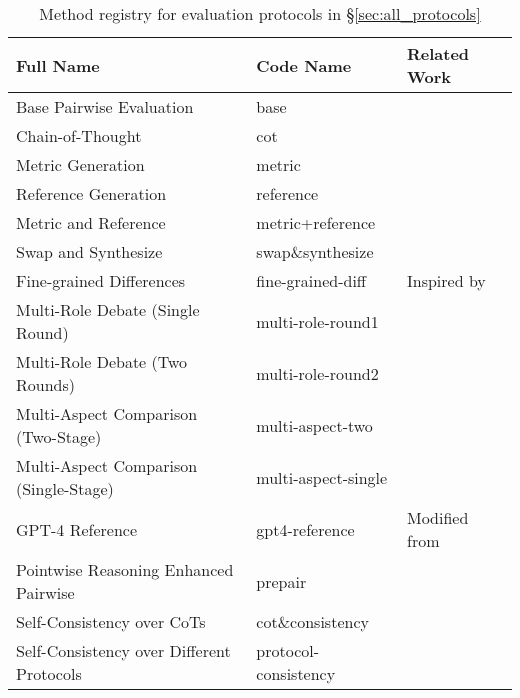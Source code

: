 \begin{table*}[ht!]
    \centering
    \footnotesize
    \begin{tabular}{@{}lll@{}}
    \toprule
    \textbf{Full Name} & \textbf{Code Name} & \textbf{Related Work} \\
    \midrule
    Base Pairwise Evaluation & base & \citet{zeng2024evaluating} \\
    Chain-of-Thought & cot & \citet{zeng2024evaluating,wei2022chain} \\
    Metric Generation & metric & \citet{zeng2024evaluating} \\
    Reference Generation & reference & \citet{zeng2024evaluating}  \\
    Metric and Reference & metric+reference & \citet{zeng2024evaluating} \\
    Swap and Synthesize & swap\&synthesize  & \citet{zeng2024evaluating} \\
    Fine-grained Differences & fine-grained-diff & Inspired by \citet{liu-etal-2023-revisiting, liu-etal-2023-towards-interpretable, min-etal-2023-factscore} \\
    Multi-Role Debate (Single Round) & multi-role-round1  & \citet{chan2024chateval} \\
    Multi-Role Debate (Two Rounds) & multi-role-round2  & \citet{chan2024chateval} \\
    Multi-Aspect Comparison (Two-Stage) & multi-aspect-two  & \citet{li2024decompose} \\
    Multi-Aspect Comparison (Single-Stage) & multi-aspect-single  & \citet{li2024decompose} \\
    GPT-4 Reference & gpt4-reference & Modified from \citet{zeng2024evaluating} \\
    Pointwise Reasoning Enhanced Pairwise & prepair  & \citet{jeong2024prepair} \\
    Self-Consistency over CoTs & cot\&consistency & \citet{wang2023selfconsistency} \\
    Self-Consistency over Different Protocols & protocol-consistency & \citet{wang2023selfconsistency} \\
    \bottomrule
    \end{tabular}
    \caption{Method registry for evaluation protocols in \S\ref{sec:all_protocols}}
    \label{tab:appx_method_registry}
\end{table*}